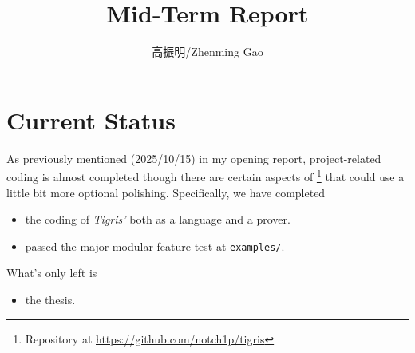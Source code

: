 \documentclass[a4paper, 11pt]{article}
\title{Mid-Term Report}
\author{高振明/Zhenming Gao}
\theoremstyle{remark}\newtheorem*{remark}{Remark}
\theoremstyle{definition}\newtheorem*{definition}{Definition}
\begin{document}
\maketitle
\section{Current Status}

As previously mentioned (2025/10/15) in my opening report, project-related coding is almost completed though
there are certain aspects of \Tigris\footnote{Repository at \url{https://github.com/notch1p/tigris}} that could use a little bit more optional polishing.
Specifically, we have completed
\begin{itemize}
  \item the coding of \emph{Tigris'} both as a language and a prover.
  \item passed the major modular feature test at \texttt{examples/}.
\end{itemize}
What's only left is
\begin{itemize}
  \item the thesis.
\end{itemize}
\end{document}
